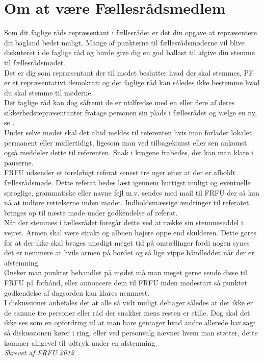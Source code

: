 \section*{Om at være Fællesrådsmedlem}
Som dit faglige råds repræsentant i fællesrådet er det din opgave at repræsentere dit bagland bedst muligt. Mange af punkterne til fællesrådsmøderne vil blive diskuteret i de faglige råd og burde give dig en god ballast til afgive din stemme til fællesrådsmødet.\\

Det er dig som repræsentant der til mødet beslutter hvad der skal stemmes, PF er et repræsentativt demokrati og det faglige råd kan således ikke bestemme hvad du skal stemme til møderne.\\
Det faglige råd kan dog såfremt de er utilfredse med en eller flere af deres sikkerhedsrepræsentanter fratage personen sin plads i fællesrådet og vælge en ny, se .\\ 

Under selve mødet skal det altid meldes til referenten hvis man forlader lokalet permanent eller midlertidigt, ligesom man ved tilbagekomst eller sen ankomst også meddeler dette til referenten.
Snak i krogene frabedes, det kan man klare i pauserne.\\

FRFU udsender et foreløbigt referat senest tre uger efter at der er afholdt fællesrådsmøde. Dette referat bedes læst igennem hurtigst muligt og eventuelle sproglige, grammatiske eller navne fejl m.v. sendes med mail til FRFU der så kan nå at indføre rettelserne inden mødet. Indholdsmæssige ændringer til referatet bringes op til næste møde under godkendelse af referat.\\

Når der stemmes i fællesrådet foregår dette ved at række sin stemmeseddel i vejret. Armen skal være strakt og albuen højere oppe end skulderen. Dette gøres for at der ikke skal bruges unødigt meget tid på omtællinger fordi nogen synes det er nemmere at hvile armen på bordet og så lige vippe håndleddet når der er afstemning.\\

Ønsker man punkter behandlet på mødet må man meget gerne sende disse til FRFU på forhånd, eller annoncere dem til FRFU inden mødestart så punktet godkendelse af dagsorden kan klares nemmest.\\
I diskussioner anbefales det at alle så vidt muligt deltager således at det ikke er de samme tre personer eller råd der snakker mens resten er stille. Dog skal det ikke ses som en opfordring til at man bare gentager hvad andre allerede har sagt så diskussionen kører i ring, eller ved personvalg nævner hvem man støtter, dette kommer alligevel til udtryk under en afstemning.
\\
\textit{Skrevet af FRFU 2012}